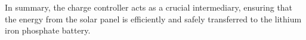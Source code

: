 In summary, the charge controller acts as a crucial intermediary, ensuring that the energy from the solar panel is efficiently and safely transferred to the lithium iron phosphate battery.

